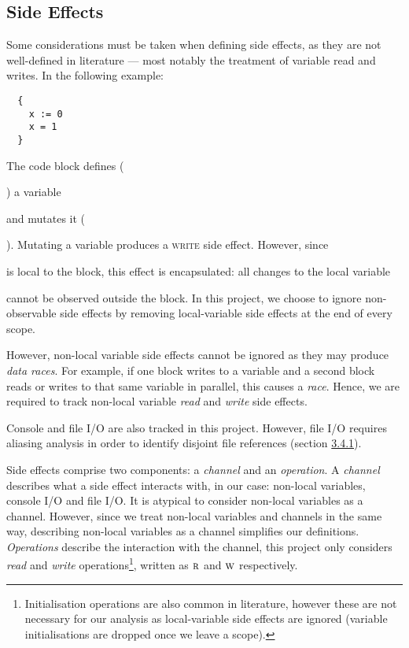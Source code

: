 \label{sec:2.4}

\subsection{Side Effects}

\label{sec:2.4.1}

Some considerations must be taken when defining side effects, as they are not well-defined in literature — most notably the treatment of variable read and writes. In the following example:

\begin{verbatim}
  {
    x := 0 
    x = 1
  }
\end{verbatim}

The code block defines (\ignore{\texttt{:=}}) a variable  and mutates it (\ignore{\texttt{=}}). Mutating a variable produces a \textsc{write} side effect. However, since  is local to the block, this effect is encapsulated: all changes to the local variable  cannot be observed outside the block. In this project, we choose to ignore non-observable  side effects by removing local-variable side effects at the end of every scope.

However, non-local variable side effects cannot be ignored as they may produce \textit{data races}. For example, if one block writes to a variable and a second block reads or writes to that same variable in parallel, this causes a \textit{race}. Hence, we are required to track non-local variable \textit{read} and \textit{write} side effects.

Console and file I/O are also tracked in this project. However, file I/O requires aliasing analysis in order to identify disjoint file references (section \hyperref[sec:3.4.1]{3.4.1}).

Side effects comprise two components: a \textit{channel} and an \textit{operation}. A \textit{channel} describes what a side effect interacts with, in our case: non-local variables, console I/O and file I/O. It is atypical to consider non-local variables as a channel. However, since we treat non-local variables and channels in the same way, describing non-local variables as a channel simplifies our definitions. \textit{Operations} describe the interaction with the channel, this project only considers \textit{read} and \textit{write} operations\footnote{Initialisation operations are also common in literature, however these are not necessary for our analysis as local-variable side effects are ignored (variable initialisations are dropped once we leave a scope).}, written as \( \textsc{r} \) and \( \textsc{w} \) respectively.



